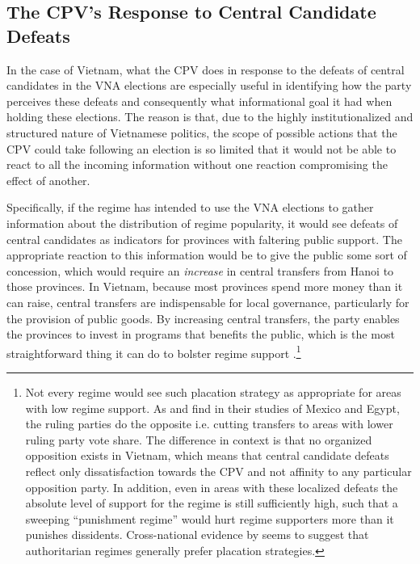 \documentclass[12pt]{article}
\newcommand{\1}{\mathbbm{1}}
\begin{document}


\subsection{The CPV's Response to Central Candidate Defeats}
\label{sec:vietnam_local_defeat}

In the case of Vietnam, what the CPV does in response to the defeats of central candidates in the VNA elections are especially useful in identifying how the party perceives these defeats and consequently what informational goal it had when holding these elections. The reason is that, due to the highly institutionalized and structured nature of Vietnamese politics, the scope of possible actions that the CPV could take following an election is so limited that it would not be able to react to all the incoming information without one reaction compromising the effect of another.

Specifically, if the regime has intended to use the VNA elections to gather information about the distribution of regime popularity, it would see defeats of central candidates as indicators for provinces with faltering public support. The appropriate reaction to this information would be to give the public some sort of concession, which would require an \textit{increase} in central transfers from Hanoi to those provinces. In Vietnam, because most provinces spend more money than it can raise, central transfers are indispensable for local governance, particularly for the provision of public goods. By increasing central transfers, the party enables the provinces to invest in programs that benefits the public, which is the most straightforward thing it can do to bolster regime support .\footnote{Not every regime would see such placation strategy as appropriate for areas with low regime support. As \citet{Magaloni2006} and \citet{Blaydes2008} find in their studies of Mexico and Egypt, the ruling parties do the opposite i.e. cutting transfers to areas with lower ruling party vote share. The difference in context is that no organized opposition exists in Vietnam, which means that central candidate defeats reflect only dissatisfaction towards the CPV and not affinity to any particular opposition party. In addition, even in areas with these localized defeats the absolute level of support for the regime is still sufficiently high, such that a sweeping ``punishment regime'' \citep{Magaloni2006} would hurt regime supporters more than it punishes dissidents.  Cross-national evidence by \citet{Miller2015} seems to suggest that authoritarian regimes generally prefer placation strategies.}
\end{document}
